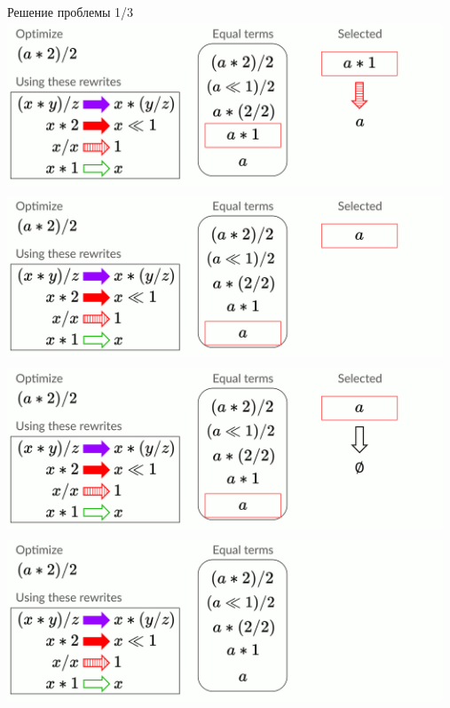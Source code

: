 \documentclass[aspectratio=169
  , xcolor={svgnames}
  , russian  %
  ]{beamer}
\begin{document}
\begin{frame}{Решение проблемы 1/3}
{   }
    {
        \centering
        \includegraphics[width=13cm, height=5cm]{misc/egraphs_images/naive/n-13.jpg}
   }
    {
        \centering
        \includegraphics[width=13cm, height=5cm]{misc/egraphs_images/naive/n-14.jpg}
   }
    {
        \centering
        \includegraphics[width=13cm, height=5cm]{misc/egraphs_images/naive/n-15.jpg}
   }
    {
        \centering
        \includegraphics[width=13cm, height=5cm]{misc/egraphs_images/naive/n-16.jpg}
   }
\end{frame}
\end{document}
